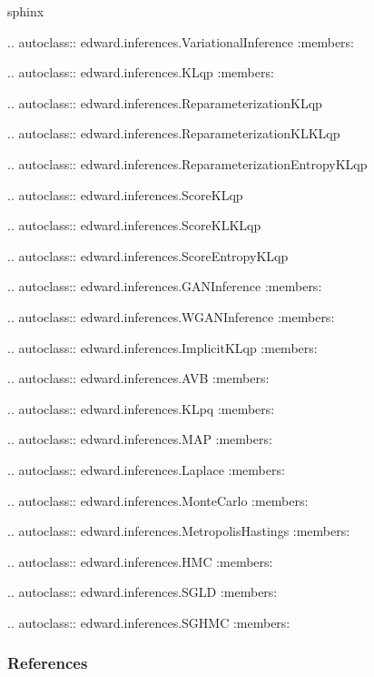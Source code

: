 {{sphinx

.. autoclass:: edward.inferences.VariationalInference
   :members:

.. autoclass:: edward.inferences.KLqp
   :members:

.. autoclass:: edward.inferences.ReparameterizationKLqp

.. autoclass:: edward.inferences.ReparameterizationKLKLqp

.. autoclass:: edward.inferences.ReparameterizationEntropyKLqp

.. autoclass:: edward.inferences.ScoreKLqp

.. autoclass:: edward.inferences.ScoreKLKLqp

.. autoclass:: edward.inferences.ScoreEntropyKLqp

.. autoclass:: edward.inferences.GANInference
   :members:

.. autoclass:: edward.inferences.WGANInference
   :members:

.. autoclass:: edward.inferences.ImplicitKLqp
   :members:

.. autoclass:: edward.inferences.AVB
   :members:

.. autoclass:: edward.inferences.KLpq
   :members:

.. autoclass:: edward.inferences.MAP
   :members:

.. autoclass:: edward.inferences.Laplace
   :members:

.. autoclass:: edward.inferences.MonteCarlo
   :members:

.. autoclass:: edward.inferences.MetropolisHastings
   :members:

.. autoclass:: edward.inferences.HMC
   :members:

.. autoclass:: edward.inferences.SGLD
   :members:

.. autoclass:: edward.inferences.SGHMC
   :members:

}}

\subsubsection{References}\label{references}

